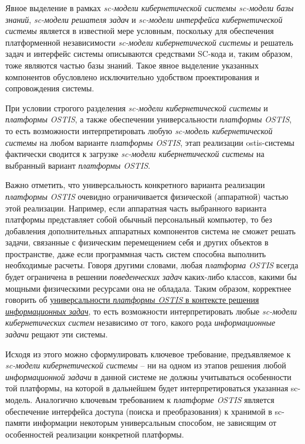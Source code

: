 Явное выделение в рамках \textit{sc-модели кибернетической системы} \textit{sc-модели базы знаний}, \textit{sc-модели решателя задач} и \textit{sc-модели интерфейса кибернетической системы} является в известной мере условным, поскольку для обеспечения платформенной независимости \textit{sc-модели кибернетической системы} и решатель задач и интерфейс системы описываются средствами SC-кода и, таким образом, тоже являются частью базы знаний. Такое явное выделение указанных компонентов обусловлено исключительно удобством проектирования и сопровождения системы.

При условии строгого разделения \textit{sc-модели кибернетической системы} и \textit{платформы OSTIS}, а также обеспечении универсальности \textit{платформы OSTIS}, то есть возможности интерпретировать любую \textit{sc-модель кибернетической системы} на любом варианте \textit{платформы OSTIS}, этап реализации ostis-системы фактически сводится к загрузке \textit{sc-модели кибернетической системы} на выбранный вариант \textit{платформы OSTIS}.

Важно отметить, что универсальность конкретного варианта реализации \textit{платформы OSTIS} очевидно ограничивается физической (аппаратной) частью этой реализации. Например, если аппаратная часть выбранного варианта платформы представляет собой обычный персональный компьютер, то без добавления дополнительных аппаратных компонентов система не сможет решать задачи, связанные с физическим перемещением себя и других объектов в пространстве, даже если программная часть систем способна выполнить необходимые расчеты. Говоря другими словами, любая \textit{платформа OSTIS} всегда будет ограничена в решении \textit{поведенческих задач} каких-либо классов, какими бы мощными физическими ресурсами она не обладала. Таким образом, корректнее говорить об \uline{универсальности \textit{платформы OSTIS} в контексте решения \textit{информационных задач}}, то есть возможности интерпретировать любые \textit{sc-модели кибернетических систем} независимо от того, какого рода \textit{информационные задачи} рещают эти системы. 

Исходя из этого можно сформулировать ключевое требование, предъявляемое к \textit{sc-модели кибернетической системы} -- ни на одном из этапов решения любой \textit{информационной задачи} в данной системе не должны учитываться особенности той платформы, на которой в дальнейшем будет интерпретироваться указанная sc-модель. Аналогично ключевым требованием к \textit{платформе OSTIS} является обеспечение интерфейса доступа (поиска и преобразования) к хранимой в sc-памяти информации некоторым универсальным способом, не зависящим от особенностей реализации конкретной платформы.

